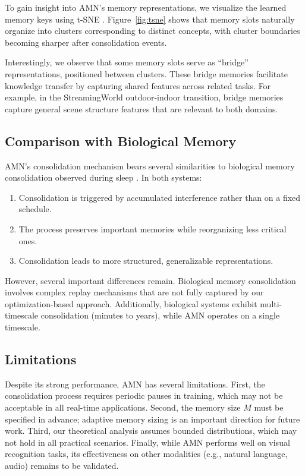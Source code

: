 \documentclass[11pt]{article}
\begin{document}
To gain insight into AMN's memory representations, we visualize the learned memory keys using t-SNE \citep{maaten2008visualizing}. Figure~\ref{fig:tsne} shows that memory slots naturally organize into clusters corresponding to distinct concepts, with cluster boundaries becoming sharper after consolidation events.

Interestingly, we observe that some memory slots serve as ``bridge'' representations, positioned between clusters. These bridge memories facilitate knowledge transfer by capturing shared features across related tasks. For example, in the StreamingWorld outdoor-indoor transition, bridge memories capture general scene structure features that are relevant to both domains.

\subsection{Comparison with Biological Memory}

AMN's consolidation mechanism bears several similarities to biological memory consolidation observed during sleep \citep{walker2017sleep}. In both systems:
\begin{enumerate}
    \item Consolidation is triggered by accumulated interference rather than on a fixed schedule.
    \item The process preserves important memories while reorganizing less critical ones.
    \item Consolidation leads to more structured, generalizable representations.
\end{enumerate}

However, several important differences remain. Biological memory consolidation involves complex replay mechanisms that are not fully captured by our optimization-based approach. Additionally, biological systems exhibit multi-timescale consolidation (minutes to years), while AMN operates on a single timescale.

\subsection{Limitations}

Despite its strong performance, AMN has several limitations. First, the consolidation process requires periodic pauses in training, which may not be acceptable in all real-time applications. Second, the memory size $M$ must be specified in advance; adaptive memory sizing is an important direction for future work. Third, our theoretical analysis assumes bounded distributions, which may not hold in all practical scenarios. Finally, while AMN performs well on visual recognition tasks, its effectiveness on other modalities (e.g., natural language, audio) remains to be validated.
\end{document}
